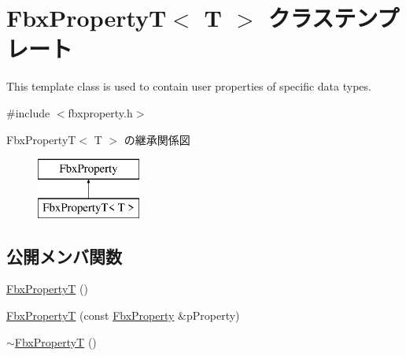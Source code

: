 \hypertarget{class_fbx_property_t}{}\section{Fbx\+PropertyT$<$ T $>$ クラステンプレート}
\label{class_fbx_property_t}


This template class is used to contain user properties of specific data types.  




{\ttfamily \#include $<$fbxproperty.\+h$>$}

Fbx\+PropertyT$<$ T $>$ の継承関係図\begin{figure}[H]
\begin{center}
\leavevmode
\includegraphics[height=2.000000cm]{class_fbx_property_t}
\end{center}
\end{figure}
\subsection*{公開メンバ関数}
\begin{DoxyCompactItemize}
\item 
\hyperlink{class_fbx_property_t_a60e994b93527d29bf782be402dfe430f}{Fbx\+PropertyT} ()
\item 
\hyperlink{class_fbx_property_t_afa5d35b87d71aa68d84f12fb39de89e4}{Fbx\+PropertyT} (const \hyperlink{class_fbx_property}{Fbx\+Property} \&p\+Property)
\item 
\hyperlink{class_fbx_property_t_a26fa61ca6f7ef315a7121d0190080622}{$\sim$\+Fbx\+PropertyT} ()
\end{DoxyCompactItemize}

